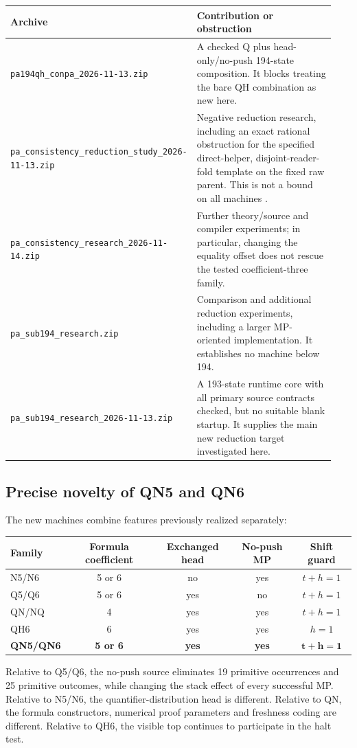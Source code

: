 \documentclass[11pt,letterpaper]{article}
\newcommand{\file}[1]{\begingroup\def\UrlBreaks{\do\/\do\_\do\-\do\.}\texttt{\nolinkurl{#1}}\endgroup}
\begin{document}
\begin{longtable}{@{}>{\raggedright\arraybackslash}p{0.43\linewidth}>{\raggedright\arraybackslash}p{0.51\linewidth}@{}}
\toprule Archive & Contribution or obstruction\\\midrule\endhead
\file{pa194qh_conpa_2026-11-13.zip} & A checked Q plus head-only/no-push 194-state
composition. It blocks treating the bare QH combination as new here.\\
\file{pa_consistency_reduction_study_2026-11-13.zip} & Negative reduction research,
including an exact rational obstruction for the specified direct-helper,
disjoint-reader-fold template on the fixed raw parent. This is not a bound on
all machines \cite{dual}.\\
\file{pa_consistency_research_2026-11-14.zip} & Further theory/source and compiler
experiments; in particular, changing the equality offset does not rescue the
tested coefficient-three family.\\
\file{pa_sub194_research.zip} & Comparison and additional reduction experiments,
including a larger MP-oriented implementation. It establishes no machine below
194.\\
\file{pa_sub194_research_2026-11-13.zip} & A 193-state runtime core with all primary
source contracts checked, but no suitable blank startup. It supplies the main
new reduction target investigated here.\\
\bottomrule
\end{longtable}

\subsection{Precise novelty of QN5 and QN6}

The new machines combine features previously realized separately:
\begin{center}
\begin{tabular}{@{}lcccc@{}}
\toprule Family & Formula coefficient & Exchanged head & No-push MP & Shift guard\\
\midrule
N5/N6 &5 or 6&no&yes&$t+h=1$\\
Q5/Q6 &5 or 6&yes&no&$t+h=1$\\
QN/NQ &4&yes&yes&$t+h=1$\\
QH6 &6&yes&yes&$h=1$\\
\textbf{QN5/QN6} &\textbf{5 or 6}&\textbf{yes}&\textbf{yes}&$\boldsymbol{t+h=1}$\\
\bottomrule
\end{tabular}
\end{center}
Relative to Q5/Q6, the no-push source eliminates 19 primitive occurrences and
25 primitive outcomes, while changing the stack effect of every successful MP.
Relative to N5/N6, the quantifier-distribution head is different. Relative to
QN, the formula constructors, numerical proof parameters and freshness coding
are different. Relative to QH6, the visible top continues to participate in
the halt test.
\end{document}
